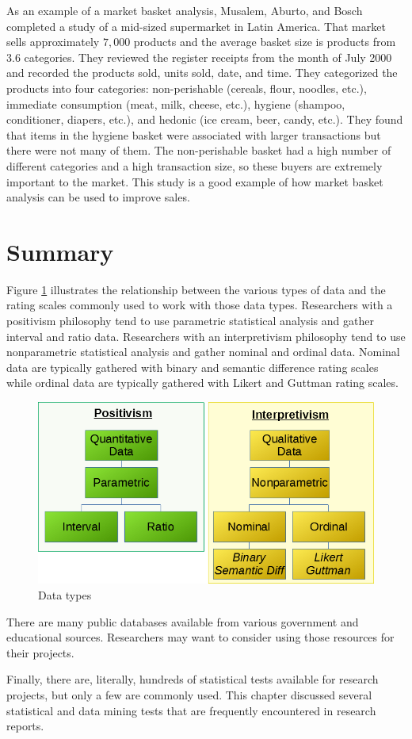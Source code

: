 As an example of a market basket analysis, Musalem, Aburto, and Bosch completed a study of a mid-sized supermarket in Latin America\cite{musalem2018market}. That market sells approximately $ 7,000 $ products and the average basket size is products from $ 3.6 $ categories. They reviewed the register receipts from the month of July 2000 and recorded the products sold, units sold, date, and time. They categorized the products into four categories: non-perishable (cereals, flour, noodles, etc.), immediate consumption (meat, milk, cheese, etc.), hygiene (shampoo, conditioner, diapers, etc.), and hedonic (ice cream, beer, candy, etc.). They found that items in the hygiene basket were associated with larger transactions but there were not many of them. The non-perishable basket had a high number of different categories and a high transaction size, so these buyers are extremely important to the market. This study is a good example of how market basket analysis can be used to improve sales.

\section{Summary}\label{ch06:summary}

Figure \ref{fig06.04} illustrates the relationship between the various types of data and the rating scales commonly used to work with those data types. Researchers with a positivism philosophy tend to use parametric statistical analysis and gather interval and ratio data. Researchers with an interpretivism philosophy tend to use nonparametric statistical analysis and gather nominal and ordinal data. Nominal data are typically gathered with binary and semantic difference rating scales while ordinal data are typically gathered with Likert and Guttman rating scales.

\begin{figure}[H]
	\centering
	\includegraphics[width=\maxwidth{.95\linewidth}]{gfx/06-DataTypes}
	\caption{Data types}
	\label{fig06.04}
\end{figure}

There are many public databases available from various government and educational sources. Researchers may want to consider using those resources for their projects.

Finally, there are, literally, hundreds of statistical tests available for research projects, but only a few are commonly used. This chapter discussed several statistical and data mining tests that are frequently encountered in research reports.